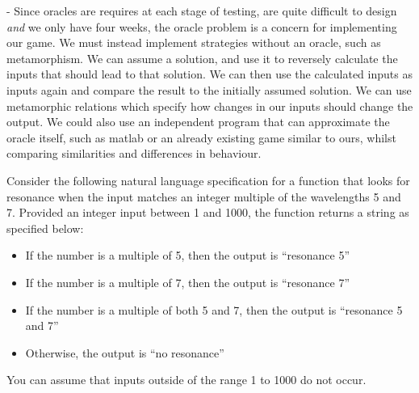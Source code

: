 \documentclass[12pt,fleqn]{examtst}
\begin{document}
\begin{enumerate}
  - Since oracles are requires at each stage of testing, are quite difficult to design \textit{and} we only have four weeks, the oracle problem is a concern for implementing our game. We must instead implement strategies without an oracle, such as metamorphism. We can assume a solution, and use it to reversely calculate the inputs that should lead to that solution. We can then use the calculated inputs as inputs again and compare the result to the initially assumed solution. We can use metamorphic relations which specify how changes in our inputs should change the output. We could also use an independent program that can approximate the oracle itself, such as matlab or an already existing game similar to ours, whilst comparing similarities and differences in behaviour.
    
\end{enumerate}


\newpage

 Consider the following natural language specification for a
function that looks for resonance when the input matches an integer multiple of
the wavelengths 5 and 7. Provided an integer input between 1 and 1000, the
function returns a string as specified below:

\begin{itemize}
\item If the number is a multiple of 5, then the output is “resonance 5”
\item If the number is a multiple of 7, then the output is “resonance 7”
\item If the number is a multiple of both 5 and 7, then the output is “resonance
  5 and 7”
\item Otherwise, the output is “no resonance”
\end{itemize}

You can assume that inputs outside of the range 1 to 1000 do not occur.
\end{document}
